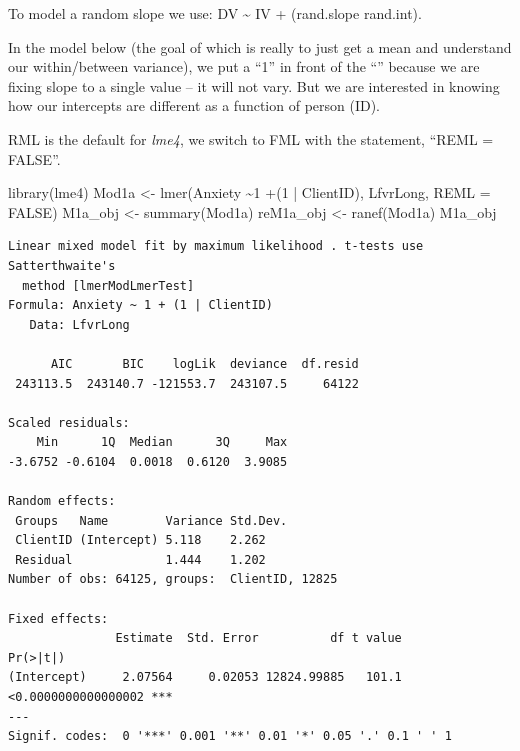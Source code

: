 \documentclass[
  english,
]{book}
\newenvironment{Shaded}{\begin{snugshade}}{\end{snugshade}}
\newcommand{\AttributeTok}[1]{\textcolor[rgb]{0.77,0.63,0.00}{#1}}
\newcommand{\ConstantTok}[1]{\textcolor[rgb]{0.00,0.00,0.00}{#1}}
\newcommand{\DecValTok}[1]{\textcolor[rgb]{0.00,0.00,0.81}{#1}}
\newcommand{\FunctionTok}[1]{\textcolor[rgb]{0.00,0.00,0.00}{#1}}
\newcommand{\NormalTok}[1]{#1}
\newcommand{\OtherTok}[1]{\textcolor[rgb]{0.56,0.35,0.01}{#1}}
\newcommand{\SpecialCharTok}[1]{\textcolor[rgb]{0.00,0.00,0.00}{#1}}
\begin{document}
To model a random slope we use: DV \textasciitilde{} IV + (rand.slope \textbar{} rand.int).

In the model below (the goal of which is really to just get a mean and understand our within/between variance), we put a ``1'' in front of the ``\textbar{}'' because we are fixing slope to a single value -- it will not vary. But we are interested in knowing how our intercepts are different as a function of person (ID).

RML is the default for \emph{lme4}, we switch to FML with the statement, ``REML = FALSE''.

\begin{Shaded}
\begin{Highlighting}[]
\FunctionTok{library}\NormalTok{(lme4)}
\NormalTok{Mod1a }\OtherTok{\textless{}{-}} \FunctionTok{lmer}\NormalTok{(Anxiety }\SpecialCharTok{\textasciitilde{}}\DecValTok{1} \SpecialCharTok{+}\NormalTok{(}\DecValTok{1} \SpecialCharTok{|}\NormalTok{ ClientID), LfvrLong, }\AttributeTok{REML =} \ConstantTok{FALSE}\NormalTok{)}
\NormalTok{M1a\_obj }\OtherTok{\textless{}{-}} \FunctionTok{summary}\NormalTok{(Mod1a)}
\NormalTok{reM1a\_obj }\OtherTok{\textless{}{-}} \FunctionTok{ranef}\NormalTok{(Mod1a)}
\NormalTok{M1a\_obj}
\end{Highlighting}
\end{Shaded}

\begin{verbatim}
Linear mixed model fit by maximum likelihood . t-tests use Satterthwaite's
  method [lmerModLmerTest]
Formula: Anxiety ~ 1 + (1 | ClientID)
   Data: LfvrLong

      AIC       BIC    logLik  deviance  df.resid 
 243113.5  243140.7 -121553.7  243107.5     64122 

Scaled residuals: 
    Min      1Q  Median      3Q     Max 
-3.6752 -0.6104  0.0018  0.6120  3.9085 

Random effects:
 Groups   Name        Variance Std.Dev.
 ClientID (Intercept) 5.118    2.262   
 Residual             1.444    1.202   
Number of obs: 64125, groups:  ClientID, 12825

Fixed effects:
               Estimate  Std. Error          df t value            Pr(>|t|)    
(Intercept)     2.07564     0.02053 12824.99885   101.1 <0.0000000000000002 ***
---
Signif. codes:  0 '***' 0.001 '**' 0.01 '*' 0.05 '.' 0.1 ' ' 1
\end{verbatim}
\end{document}
